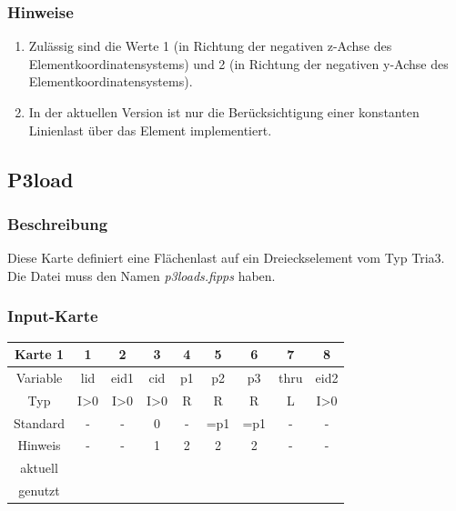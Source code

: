 \documentclass[11pt,titlepage,listof=totoc,bibliography=totoc,twoside]{scrreprt}
\begin{document}
{{\subsubsection{Hinweise}

\begin{enumerate}
\item Zulässig sind die Werte 1 (in Richtung der negativen z-Achse des Elementkoordinatensystems) und 2 (in Richtung der negativen y-Achse des Elementkoordinatensystems).
\item In der aktuellen Version ist nur die Berücksichtigung einer konstanten Linienlast über das Element implementiert.
\end{enumerate}

\newpage

\subsection{P3load}

\subsubsection{Beschreibung}

Diese Karte definiert eine Flächenlast auf ein Dreieckselement vom Typ Tria3.\\
Die Datei muss den Namen \emph{p3loads.fipps} haben.

\subsubsection{Input-Karte}

\begin{table}[htbp]
\centering
\begin{tabularx}{\textwidth}{cCCCCCCCC}
\toprule
Karte 1	& 1		& 2		& 3		& 4		& 5		& 6		& 7		& 8	\\
\midrule
Variable& lid		& eid1		& cid		& p1		& p2		& p3		& thru		& eid2	\\
Typ	& I>0		& I>0		& I>0		& R		& R		& R		& L		& I>0	\\
Standard& -		& -		& 0		& -		& =p1		& =p1		& -		& -	\\
Hinweis	& -		& -		& 1		& 2		& 2		& 2		& -		& -	\\
aktuell	& 	& 	& 	& 	& 	& 	& 	& 	\\
genutzt \\
\bottomrule
\end{tabularx}
\end{table}

}}
\end{document}
